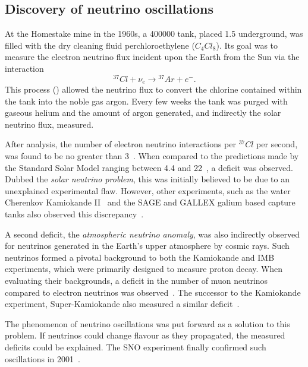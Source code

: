 \subsection{Discovery of neutrino oscillations} %
\label{sec:theory_history_osc} %

At the Homestake mine in the 1960s, a \SI{400000}{} tank, placed \SI{1.5}{}
underground, was filled with the dry cleaning fluid perchloroethylene ($C_{4}Cl_{8}$). Its goal
was to measure the electron neutrino flux incident upon the Earth from the Sun via the interaction
\begin{equation} %
    {}^{37}Cl+\nu_{e}\rightarrow{}^{37}Ar+e^{-}.
    \label{eq:homestake}
\end{equation} %
This process () allowed the neutrino flux to convert the chlorine
contained within the tank into the noble gas argon. Every few weeks the tank was purged with
gaseous helium and the amount of argon generated, and indirectly the solar neutrino flux,
measured.

After analysis, the number of electron neutrino interactions per ${}^{37}Cl$ per second, was found
to be no greater than 3~\cite{davis1968}. When compared to the predictions made by the Standard
Solar Model ranging between 4.4 and 22~\cite{bahcall1968}, a deficit was observed. Dubbed the
\emph{solar neutrino problem}, this was initially believed to be due to an unexplained
experimental flaw. However, other experiments, such as the water Cherenkov Kamiokande
II~\cite{hirata1989} and the SAGE and GALLEX galium based capture tanks also observed this
discrepancy~\cite{abazov1991, anselmann1994}.

A second deficit, the \emph{atmospheric neutrino anomaly}, was also indirectly observed for
neutrinos generated in the Earth's upper atmosphere by cosmic rays. Such neutrinos formed a
pivotal background to both the Kamiokande and IMB experiments, which were primarily designed to
measure proton decay. When evaluating their backgrounds, a deficit in the number of muon neutrinos
compared to electron neutrinos was observed~\cite{hirata1988, becker1992}. The successor to the
Kamiokande experiment, Super-Kamiokande also measured a similar deficit~\cite{kajita1999}.

The phenomenon of neutrino oscillations was put forward as a solution to this problem. If
neutrinos could change flavour as they propagated, the measured deficits could be explained. The
SNO experiment finally confirmed such oscillations in 2001~\cite{ahmad2002}.

